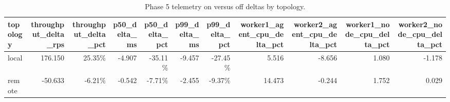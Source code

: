 \begin{table}[t]
\centering
\caption{Phase 5 telemetry on versus off deltas by topology.}
\label{tab:phase5_overhead_delta}
\begin{tabular}{lrrrrrrrrrr}
\hline
topology & throughput\_delta\_rps & throughput\_delta\_pct & p50\_delta\_ms & p50\_delta\_pct & p99\_delta\_ms & p99\_delta\_pct & worker1\_agent\_cpu\_delta\_pct & worker2\_agent\_cpu\_delta\_pct & worker1\_node\_cpu\_delta\_pct & worker2\_node\_cpu\_delta\_pct \\
\hline
local & 176.150 & 25.35\% & -4.907 & -35.11\% & -9.457 & -27.45\% & 5.516 & -8.656 & 1.080 & -1.178 \\
remote & -50.633 & -6.21\% & -0.542 & -7.71\% & -2.455 & -9.37\% & 14.473 & -0.244 & 1.752 & 0.029 \\
\hline
\end{tabular}
\end{table}

